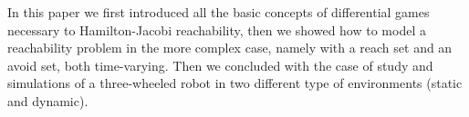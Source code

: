 In this paper we first introduced all the basic concepts of differential games necessary to Hamilton-Jacobi reachability, then we showed how to model a reachability problem in the more complex case, namely with a reach set and an avoid set, both time-varying. Then we concluded with the case of study and simulations of a three-wheeled robot in two different type of environments (static and dynamic).